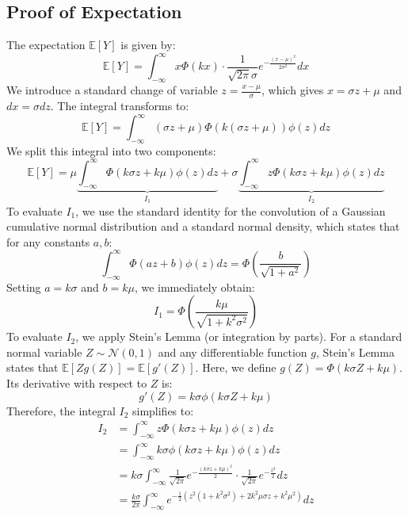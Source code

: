 \documentclass{article}
\theoremstyle{plain}
\theoremstyle{definition}
\theoremstyle{remark}
\begin{document}
\subsection{Proof of Expectation}
The expectation $\mathbb{E}[Y]$ is given by:
\begin{equation}
    \mathbb{E}[Y] = \int_{-\infty}^{\infty} x \Phi(k x) \cdot \frac{1}{\sqrt{2\pi}\sigma} e^{-\frac{(x-\mu)^2}{2\sigma^2}} dx
\end{equation}
We introduce a standard change of variable $z = \frac{x-\mu}{\sigma}$, which gives $x = \sigma z + \mu$ and $dx = \sigma dz$. The integral transforms to:
\begin{equation}
    \mathbb{E}[Y] = \int_{-\infty}^{\infty} (\sigma z + \mu) \Phi(k(\sigma z + \mu)) \phi(z) dz
\end{equation}
We split this integral into two components:
\begin{equation}
    \mathbb{E}[Y] = \mu \underbrace{\int_{-\infty}^{\infty} \Phi(k\sigma z + k\mu) \phi(z) dz}_{I_1} + \sigma \underbrace{\int_{-\infty}^{\infty} z \Phi(k\sigma z + k\mu) \phi(z) dz}_{I_2}
\end{equation}
To evaluate $I_1$, we use the standard identity for the convolution of a Gaussian cumulative normal distribution and a standard normal density, which states that for any constants $a, b$:
\begin{equation}
    \int_{-\infty}^{\infty} \Phi(a z + b) \phi(z) dz = \Phi\left( \frac{b}{\sqrt{1+a^2}} \right)
\end{equation}
Setting $a = k\sigma$ and $b = k\mu$, we immediately obtain:
\begin{equation}
    I_1 = \Phi\left( \frac{k\mu}{\sqrt{1+k^2\sigma^2}} \right)
\end{equation}
To evaluate $I_2$, we apply Stein's Lemma (or integration by parts). For a standard normal variable $Z \sim \mathcal{N}(0, 1)$ and any differentiable function $g$, Stein's Lemma states that $\mathbb{E}[Z g(Z)] = \mathbb{E}[g'(Z)]$. Here, we define $g(Z) = \Phi(k\sigma Z + k\mu)$. Its derivative with respect to $Z$ is:
\begin{equation}
    g'(Z) = k\sigma \phi(k\sigma Z + k\mu)
\end{equation}
Therefore, the integral $I_2$ simplifies to:
\begin{align}
    I_2 &= \int_{-\infty}^{\infty} z \Phi(k\sigma z + k\mu) \phi(z) dz \nonumber \\
    &= \int_{-\infty}^{\infty} k\sigma \phi(k\sigma z + k\mu) \phi(z) dz \nonumber \\
    &= k\sigma \int_{-\infty}^{\infty} \frac{1}{\sqrt{2\pi}} e^{-\frac{(k\sigma z + k\mu)^2}{2}} \cdot \frac{1}{\sqrt{2\pi}} e^{-\frac{z^2}{2}} dz \nonumber \\
    &= \frac{k\sigma}{2\pi} \int_{-\infty}^{\infty} e^{-\frac{1}{2}\left( z^2 (1 + k^2\sigma^2) + 2k^2\mu\sigma z + k^2\mu^2 \right)} dz
\end{align}
\end{document}
